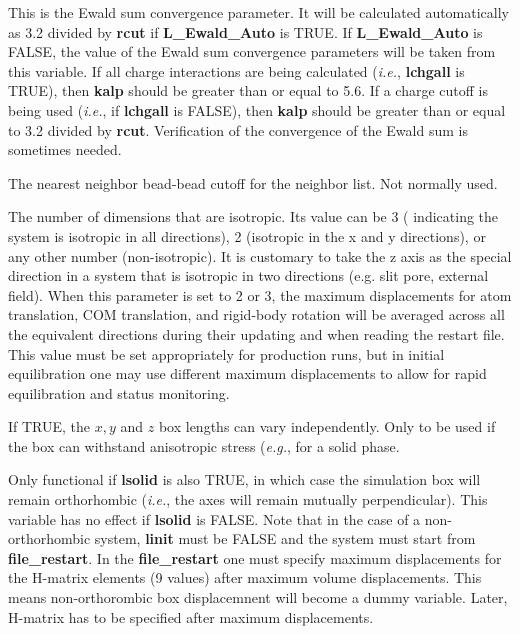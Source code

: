 \documentclass[12pt,letterpaper]{article}
\begin{document}
 This is the Ewald sum convergence
parameter. It will be calculated automatically as 3.2
divided by {\bf rcut} if {\bf L\_Ewald\_Auto} is TRUE. If
{\bf L\_Ewald\_Auto} is FALSE, the value of the Ewald sum
convergence parameters will be taken from this variable. If
all charge interactions are being calculated (\textit{i.e.},
{\bf lchgall} is TRUE), then {\bf kalp} should be greater
than or equal to 5.6. If a charge cutoff is being used
(\textit{i.e.}, if {\bf lchgall} is FALSE), then {\bf kalp}
should be greater than or equal to 3.2 divided by {\bf
  rcut}. Verification of the convergence of the Ewald sum is
sometimes needed.

 The nearest neighbor bead-bead cutoff
for the neighbor list. Not normally used.

 The number of
dimensions that are isotropic. Its value can be 3 (
indicating the system is isotropic in all directions), 2
(isotropic in the x and y directions), or any other number
(non-isotropic). It is customary to take the z axis as the
special direction in a system that is isotropic in two
directions (e.g. slit pore, external field). When this
parameter is set to 2 or 3, the maximum displacements for
atom translation, COM translation, and rigid-body rotation
will be averaged across all the equivalent directions during
their updating and when reading the restart file. This value
must be set appropriately for production runs, but in
initial equilibration one may use different maximum
displacements to allow for rapid equilibration and status
monitoring.

 If TRUE, the $x, y$ and $z$ box
lengths can vary independently. Only to be used if the box
can withstand anisotropic stress (\textit{e.g.}, for a solid
phase.

 Only functional if {\bf lsolid} is
also TRUE, in which case the simulation box will remain
orthorhombic (\textit{i.e.}, the axes will remain mutually
perpendicular). This variable has no effect if {\bf lsolid}
is FALSE. Note that in the case of a non-orthorhombic
system, {\bf linit} must be FALSE and the system must start
from {\bf file\_restart}. In the {\bf file\_restart} one must
specify maximum displacements for the H-matrix elements
(9 values) after maximum volume displacements. This means
non-orthorombic box displacemnent will become a dummy variable.
Later, H-matrix has to be specified after maximum displacements.
\end{document}
